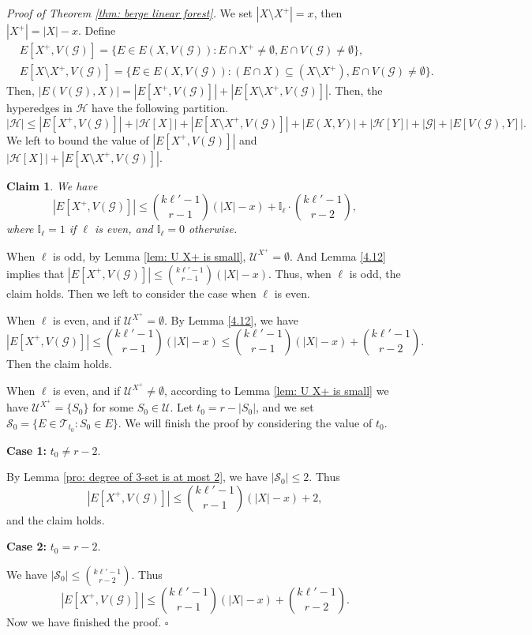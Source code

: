 \documentclass[12pt]{article}%
\newtheorem{claim}[theorem]{Claim}
\newenvironment{proof}{{\noindent\it Proof.}}{\hfill $\square$\par}
\newcommand{\mh}{\mathcal{H}}
\newcommand{\mg}{\mathcal{G}}
\begin{document}
\noindent\emph{Proof of Theorem \ref{thm: berge linear forest}.}
We set $|X\setminus X^+|=x$, then $|X^+|=|X|-x$.
Define
\begin{equation*}
    \begin{aligned}
        &E[X^{+},V(\mg)]=\{E\in E(X,V(\mg)): E\cap X^{+}\neq \emptyset, E\cap V(\mg)\neq \emptyset\},\\
        &E[X\setminus X^{+},V(\mg)]=\{E\in E(X,V(\mg)):(E\cap X)\subseteq (X\setminus X^{+}), E\cap V(\mg)\neq \emptyset\}.
    \end{aligned}
\end{equation*}
Then, $|E(V(\mg),X)|= |E[X^{+},V(\mg)]|+|E[X\setminus X^{+},V(\mg)]|$.
Then, the hyperedges in $\mh$ have the following partition.
 $$|\mh|\leq |E[X^+,V(\mg)]|+|\mh[X]|+|E[X\setminus X^+,V(\mg)]|+|E(X,Y)|+|\mh[Y]|+|\mg|+|E[V(\mg),Y]|.$$
We left to bound the value of $|E[X^{+},V(\mg)]|$ and $|\mh[X]|+|E[X\setminus X^{+},V(\mg)]|$.
\begin{claim}\label{X+V(mg)}
We have
\begin{equation*}
    |E[X^{+},V(\mg)]|\leq \binom{k\ell'-1}{r-1}(|X|-x)+\mathbb{I}_{\ell}\cdot\binom{k\ell'-1}{r-2},
\end{equation*}
where $\mathbb{I}_\ell=1$ if $\ell$ is even, and $\mathbb{I}_\ell=0$ otherwise.
\end{claim}
\begin{proof}
When $\ell$ is odd, by Lemma \ref{lem: U X+ is small}, $\mathcal{U}^{X^+}=\emptyset$. And Lemma \ref{4.12} implies that $|E[X^+,V(\mg)]|\leq \binom{k\ell'-1}{r-1}(|X|-x)$. Thus, when $\ell$ is odd, the claim holds.
Then we left to consider the case when $\ell$ is even.
\par
When $\ell$ is even, and  if $\mathcal{U}^{X^+}=\emptyset$. By Lemma \ref{4.12}, we have $$|E[X^+,V(\mg)]|\leq \binom{k\ell'-1}{r-1}(|X|-x)\leq \binom{k\ell'-1}{r-1}(|X|-x)+\binom{k\ell'-1}{r-2}. $$
Then the claim holds.
\par
When $\ell$ is even, and if $\mathcal{U}^{X^+}\neq\emptyset$, according to Lemma \ref{lem: U X+ is small} we have $\mathcal{U}^{X^+}=\{S_0\}$ for some $S_0\in\mathcal{U}$. Let $t_0=r-|S_0|$, and we set $\mathcal{S}_0=\{E\in\mathcal{T}_{t_0}: S_0\in E\}$. We will finish the proof by considering the value of $t_0$.

\noindent\textbf{Case 1:} $t_0\neq r-2$.

By Lemma \ref{pro: degree of 3-set is at most 2}, we have $|\mathcal{S}_0|\leq 2$. Thus
$$|E[X^{+},V(\mg)]|\leq \binom{k\ell'-1}{r-1}(|X|-x)+2,$$
and the claim holds.
\par\noindent
\textbf{Case 2:}
$t_0= r-2$.

We have $|\mathcal{S}_0|\leq \binom{k\ell'-1}{r-2}$. Thus
$$|E[X^{+},V(\mg)]|\leq \binom{k\ell'-1}{r-1}(|X|-x)+\binom{k\ell'-1}{r-2}.$$
Now we have finished the proof.
\end{proof}
\end{document}
